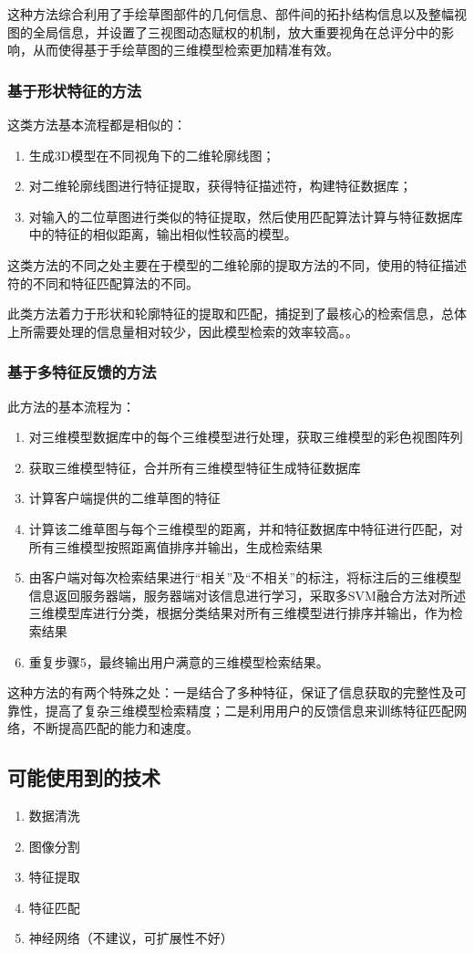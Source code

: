 \documentclass{article}
\begin{document}
这种方法综合利用了手绘草图部件的几何信息、部件间的拓扑结构信息以及整幅视图的全局信息，并设置了三视图动态赋权的机制，放大重要视角在总评分中的影响，从而使得基于手绘草图的三维模型检索更加精准有效。
\subsubsection{基于形状特征的方法}
这类方法基本流程都是相似的：
\begin{enumerate}
    \item 生成3D模型在不同视角下的二维轮廓线图；
    \item 对二维轮廓线图进行特征提取，获得特征描述符，构建特征数据库；
    \item 对输入的二位草图进行类似的特征提取，然后使用匹配算法计算与特征数据库中的特征的相似距离，输出相似性较高的模型。
\end{enumerate}
   
这类方法的不同之处主要在于模型的二维轮廓的提取方法的不同，使用的特征描述符的不同和特征匹配算法的不同。

此类方法着力于形状和轮廓特征的提取和匹配，捕捉到了最核心的检索信息，总体上所需要处理的信息量相对较少，因此模型检索的效率较高。。
\subsubsection{基于多特征反馈的方法}
此方法的基本流程为：
\begin{enumerate}
    \item 对三维模型数据库中的每个三维模型进行处理，获取三维模型的彩色视图阵列
    \item 获取三维模型特征，合并所有三维模型特征生成特征数据库
    \item 计算客户端提供的二维草图的特征
    \item 计算该二维草图与每个三维模型的距离，并和特征数据库中特征进行匹配，对所有三维模型按照距离值排序并输出，生成检索结果
    \item 由客户端对每次检索结果进行“相关”及“不相关”的标注，将标注后的三维模型信息返回服务器端，服务器端对该信息进行学习，采取多SVM融合方法对所述三维模型库进行分类，根据分类结果对所有三维模型进行排序并输出，作为检索结果
    \item 重复步骤5，最终输出用户满意的三维模型检索结果。
\end{enumerate}

这种方法的有两个特殊之处：一是结合了多种特征，保证了信息获取的完整性及可靠性，提高了复杂三维模型检索精度；二是利用用户的反馈信息来训练特征匹配网络，不断提高匹配的能力和速度。
\subsection{可能使用到的技术}
\begin{enumerate}
    \item 数据清洗
    \item 图像分割
    \item 特征提取
    \item 特征匹配
    \item 神经网络（不建议，可扩展性不好）
\end{enumerate}
    
\end{document}
